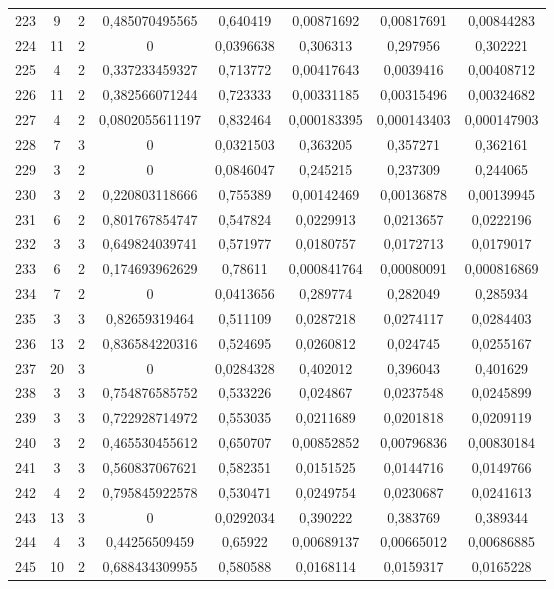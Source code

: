 \begin{longtable}{|c|c|c|c|c|c|c|c|}
223 & 9 & 2 & 0,485070495565 & 0,640419 & 0,00871692 & 0,00817691 & 0,00844283  \\
224 & 11 & 2 & 0 & 0,0396638 & 0,306313 & 0,297956 & 0,302221  \\
225 & 4 & 2 & 0,337233459327 & 0,713772 & 0,00417643 & 0,0039416 & 0,00408712  \\
226 & 11 & 2 & 0,382566071244 & 0,723333 & 0,00331185 & 0,00315496 & 0,00324682  \\
227 & 4 & 2 & 0,0802055611197 & 0,832464 & 0,000183395 & 0,000143403 & 0,000147903  \\
228 & 7 & 3 & 0 & 0,0321503 & 0,363205 & 0,357271 & 0,362161  \\
229 & 3 & 2 & 0 & 0,0846047 & 0,245215 & 0,237309 & 0,244065  \\
230 & 3 & 2 & 0,220803118666 & 0,755389 & 0,00142469 & 0,00136878 & 0,00139945  \\
231 & 6 & 2 & 0,801767854747 & 0,547824 & 0,0229913 & 0,0213657 & 0,0222196  \\
232 & 3 & 3 & 0,649824039741 & 0,571977 & 0,0180757 & 0,0172713 & 0,0179017  \\
233 & 6 & 2 & 0,174693962629 & 0,78611 & 0,000841764 & 0,00080091 & 0,000816869  \\
234 & 7 & 2 & 0 & 0,0413656 & 0,289774 & 0,282049 & 0,285934  \\
235 & 3 & 3 & 0,82659319464 & 0,511109 & 0,0287218 & 0,0274117 & 0,0284403  \\
236 & 13 & 2 & 0,836584220316 & 0,524695 & 0,0260812 & 0,024745 & 0,0255167  \\
237 & 20 & 3 & 0 & 0,0284328 & 0,402012 & 0,396043 & 0,401629  \\
238 & 3 & 3 & 0,754876585752 & 0,533226 & 0,024867 & 0,0237548 & 0,0245899  \\
239 & 3 & 3 & 0,722928714972 & 0,553035 & 0,0211689 & 0,0201818 & 0,0209119  \\
240 & 3 & 2 & 0,465530455612 & 0,650707 & 0,00852852 & 0,00796836 & 0,00830184  \\
241 & 3 & 3 & 0,560837067621 & 0,582351 & 0,0151525 & 0,0144716 & 0,0149766  \\
242 & 4 & 2 & 0,795845922578 & 0,530471 & 0,0249754 & 0,0230687 & 0,0241613  \\
243 & 13 & 3 & 0 & 0,0292034 & 0,390222 & 0,383769 & 0,389344  \\
244 & 4 & 3 & 0,44256509459 & 0,65922 & 0,00689137 & 0,00665012 & 0,00686885  \\
245 & 10 & 2 & 0,688434309955 & 0,580588 & 0,0168114 & 0,0159317 & 0,0165228  \\

\end{longtable}
